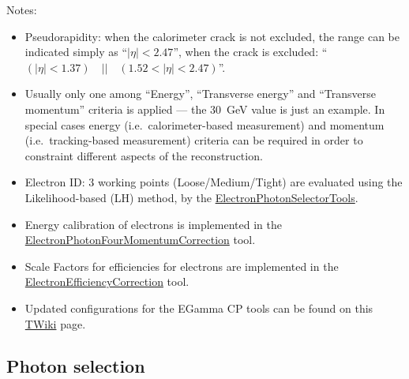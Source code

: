Notes:
\begin{itemize}
\item Pseudorapidity: when the calorimeter crack is not excluded, the range can be indicated simply as \enquote{\(|\eta| < 2.47\)}, when the crack is excluded: \enquote{\((|\eta| < 1.37) \quad || \quad (1.52 < |\eta| < 2.47)\)}.
\item Usually only one among \enquote{Energy}, \enquote{Transverse energy} and \enquote{Transverse momentum} criteria is applied --- the \qty{30}{\GeV} value is just an example.
  In special cases energy (i.e.\ calorimeter-based measurement) and momentum (i.e.\ tracking-based measurement) criteria can be required in order to constraint different aspects of the reconstruction.
\item Electron ID\@: 3 working points (Loose/Medium/Tight) are evaluated using the Likelihood-based (LH) method, by the
  \href{https://twiki.cern.ch/twiki/bin/view/AtlasProtected/EGammaIdentificationRun2}{ElectronPhotonSelectorTools}.
\item Energy calibration of electrons is implemented in the\\
  \href{https://twiki.cern.ch/twiki/bin/view/AtlasProtected/ElectronPhotonFourMomentumCorrection}{ElectronPhotonFourMomentumCorrection} tool.
\item Scale Factors for efficiencies for electrons are implemented in the\\
  \href{https://twiki.cern.ch/twiki/bin/view/AtlasProtected/XAODElectronEfficiencyCorrectionTool}{ElectronEfficiencyCorrection} tool.
\item Updated configurations for the EGamma CP tools can be found on this \href{https://twiki.cern.ch/twiki/bin/view/AtlasProtected/EGammaRecommendationsR21}{TWiki} page.
\end{itemize}

\newpage

\subsection{Photon selection}

